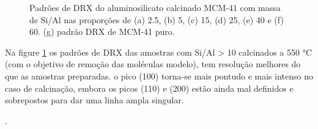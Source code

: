 \begin{figure}[ht]
    \center
    \begin{minipage}{9cm}
     \caption{Padrões de DRX do aluminosilicato calcinado MCM-41 com massa de Si/Al nas
     proporções de (a) 2.5, (b) 5, (c) 15, (d) 25, (e) 40 e (f) 60. (g) padrão DRX de MCM-41 puro.
     }\label{figureDRXLuan95} 
     \end{minipage}
\end{figure}

Na figure \ref{figureDRXLuan95} os padrões de DRX das amostras com Si/Al > 10 calcinados a 550 °C (com
o objetivo de remoção das moléculas modelo), tem resolução melhores do que as amostras preparadas. o
pico (100) torna-se mais pontudo e mais intenso no caso de calcinação, embora os picos (110) e (200)
estão ainda mal definidos e sobrepostos para dar uma linha ampla singular.

\cite{articleDahl2019}.

